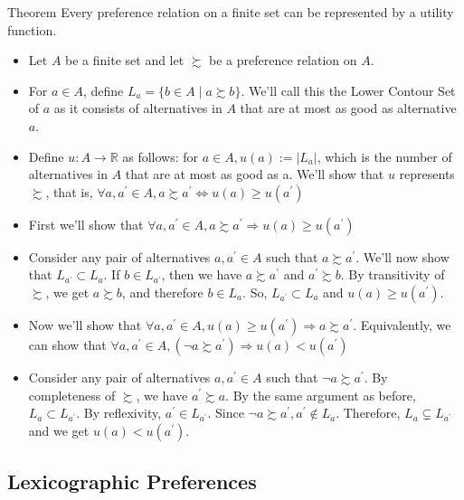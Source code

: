 \documentclass[12pt,a4paper,fleqn]{article}
\begin{document}
 Theorem
Every preference relation on a finite set can be represented by a utility function.
\begin{itemize}
  \item  Let \(A\) be a finite set and let \(\succsim \) be a preference relation on \(A\).
  \item For \(a \in A\), define \(L_a=\{b \in A \mid a \succsim b\} \). We'll call this the Lower Contour Set of \(a\) as it consists of alternatives in \(A\) that are at most as good as alternative \(a\).
  \item Define \(u: A \rightarrow \mathbb{R}\) as follows: for \(a \in A, u(a):=\left|L_a\right|\), which is the number of alternatives in \(A\) that are at most as good as a. We'll show that \(u\) represents \(\succsim \), that is, \(\forall a, a^{\prime} \in A, a \succsim a^{\prime} \Leftrightarrow u(a) \geq u\left(a^{\prime}\right)\)
  \item  First we'll show that \(\forall a, a^{\prime} \in A, a \succsim a^{\prime} \Rightarrow u(a) \geq u\left(a^{\prime}\right)\)
  \item Consider any pair of alternatives \(a, a^{\prime} \in A\) such that \(a \succsim a^{\prime}\). We'll now show that \(L_{a^{\prime}} \subset L_a\). If \(b \in L_{a^{\prime}}\), then we have \(a \succsim a^{\prime}\) and \(a^{\prime} \succsim b\). By transitivity of \(\succsim \), we get \(a \succsim b\), and therefore \(b \in L_a\). So, \(L_{a^{\prime}} \subset L_a\) and \(u(a) \geq u\left(a^{\prime}\right)\).
  \item Now we'll show that \(\forall a, a^{\prime} \in A, u(a) \geq u\left(a^{\prime}\right) \Rightarrow a \succsim a^{\prime}\). Equivalently, we can show that \(\forall a, a^{\prime} \in A,\left(\neg a \succsim a^{\prime}\right) \Rightarrow u(a)<u\left(a^{\prime}\right)\)
  \item Consider any pair of alternatives \(a, a^{\prime} \in A\) such that \(\neg a \succsim a^{\prime}\). By completeness of \(\succsim \), we have \(a^{\prime} \succsim a\). By the same argument as before, \(L_a \subset L_{a^{\prime}}\). By reflexivity, \(a^{\prime} \in L_{a^{\prime}}\). Since \(\neg a \succsim a^{\prime}, a^{\prime} \notin L_a\). Therefore, \(L_a \subsetneq L_{a^{\prime}}\) and we get \(u(a)<u\left(a^{\prime}\right)\).
\end{itemize}

 \subsection{Lexicographic Preferences} 
\end{document}
